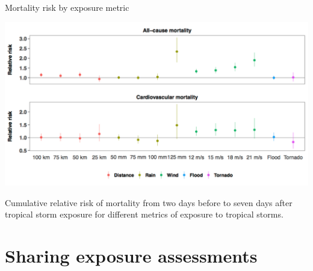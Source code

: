 \documentclass[ignorenonframetext,]{beamer}
\begin{document}
\begin{frame}{Mortality risk by exposure metric}

\begin{center}\includegraphics[width=\textwidth]{rrs_by_metric} \end{center}

\vspace{-0.3cm}

\footnotesize

Cumulative relative risk of mortality from two days before to seven days
after tropical storm exposure for different metrics of exposure to
tropical storms.

\end{frame}

\section{Sharing exposure
assessments}\label{sharing-exposure-assessments}
\end{document}
